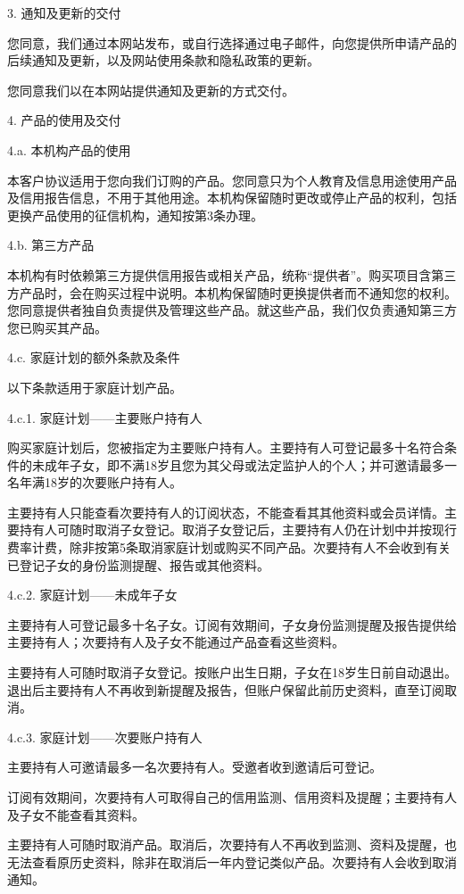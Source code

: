 \documentclass[UTF8,fontset=none,11pt,a4paper]{ctexart}
\begin{document}
3. 通知及更新的交付


您同意，我们通过本网站发布，或自行选择通过电子邮件，向您提供所申请产品的后续通知及更新，以及网站使用条款和隐私政策的更新。


您同意我们以在本网站提供通知及更新的方式交付。


4. 产品的使用及交付


4.a. 本机构产品的使用


本客户协议适用于您向我们订购的产品。您同意只为个人教育及信息用途使用产品及信用报告信息，不用于其他用途。本机构保留随时更改或停止产品的权利，包括更换产品使用的征信机构，通知按第3条办理。


4.b. 第三方产品


本机构有时依赖第三方提供信用报告或相关产品，统称“提供者”。购买项目含第三方产品时，会在购买过程中说明。本机构保留随时更换提供者而不通知您的权利。您同意提供者独自负责提供及管理这些产品。就这些产品，我们仅负责通知第三方您已购买其产品。


4.c. 家庭计划的额外条款及条件


以下条款适用于家庭计划产品。


4.c.1. 家庭计划——主要账户持有人


购买家庭计划后，您被指定为主要账户持有人。主要持有人可登记最多十名符合条件的未成年子女，即不满18岁且您为其父母或法定监护人的个人；并可邀请最多一名年满18岁的次要账户持有人。


主要持有人只能查看次要持有人的订阅状态，不能查看其其他资料或会员详情。主要持有人可随时取消子女登记。取消子女登记后，主要持有人仍在计划中并按现行费率计费，除非按第5条取消家庭计划或购买不同产品。次要持有人不会收到有关已登记子女的身份监测提醒、报告或其他资料。


4.c.2. 家庭计划——未成年子女


主要持有人可登记最多十名子女。订阅有效期间，子女身份监测提醒及报告提供给主要持有人；次要持有人及子女不能通过产品查看这些资料。


主要持有人可随时取消子女登记。按账户出生日期，子女在18岁生日前自动退出。退出后主要持有人不再收到新提醒及报告，但账户保留此前历史资料，直至订阅取消。


4.c.3. 家庭计划——次要账户持有人


主要持有人可邀请最多一名次要持有人。受邀者收到邀请后可登记。


订阅有效期间，次要持有人可取得自己的信用监测、信用资料及提醒；主要持有人及子女不能查看其资料。


主要持有人可随时取消产品。取消后，次要持有人不再收到监测、资料及提醒，也无法查看原历史资料，除非在取消后一年内登记类似产品。次要持有人会收到取消通知。
\end{document}
